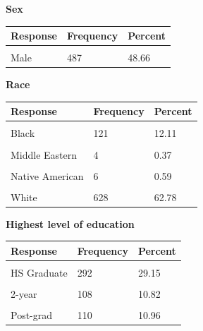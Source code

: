 \documentclass[]{article}
\begin{document}
\textbf{ Sex }

\begin{tabu} to 
\toprule
Response & Frequency & Percent\\
\midrule
{} &  & \\
Male & 487 & 48.66\\
\bottomrule
\end{tabu}

\textbf{ Race }

\begin{tabu} to 
\toprule
Response & Frequency & Percent\\
\midrule
{} &  & \\
Black & 121 & 12.11\\
 &  & \\
Middle Eastern & 4 & 0.37\\
 &  & \\
Native American & 6 & 0.59\\
 &  & \\
White & 628 & 62.78\\
\bottomrule
\end{tabu}

\textbf{ Highest level of education }

\begin{tabu} to 
\toprule
Response & Frequency & Percent\\
\midrule
{} &  & \\
HS Graduate & 292 & 29.15\\
 &  & \\
2-year & 108 & 10.82\\
 &  & \\
Post-grad & 110 & 10.96\\
\bottomrule
\end{tabu}
\end{document}
